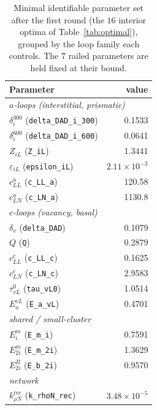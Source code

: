 \documentclass{article}
\begin{document}
\begin{table}[h!]
\centering
\caption{Minimal identifiable parameter set after the first round (the $16$
interior optima of Table~\ref{tab:optimal}), grouped by the loop family each
controls. The $7$ railed parameters are held fixed at their bound.}
\label{tab:minimal}
\renewcommand{\arraystretch}{1.15}
\small
\begin{tabular}{l r}
\hline
\textbf{Parameter} & \textbf{value}\\
\hline
\multicolumn{2}{l}{\textit{$a$-loops (interstitial, prismatic)}}\\
\quad $\delta_i^{300}$ (\texttt{delta\_DAD\_i\_300}) & 0.1533\\
\quad $\delta_i^{600}$ (\texttt{delta\_DAD\_i\_600}) & 0.0641\\
\quad $Z_{iL}$ (\texttt{Z\_iL})                      & 1.3441\\
\quad $\varepsilon_{iL}$ (\texttt{epsilon\_iL})      & $2.11\times10^{-3}$\\
\quad $c_{LL}^{a}$ (\texttt{c\_LL\_a})               & 120.58\\
\quad $c_{LN}^{a}$ (\texttt{c\_LN\_a})               & 1130.8\\
\hline
\multicolumn{2}{l}{\textit{$c$-loops (vacancy, basal)}}\\
\quad $\delta_v$ (\texttt{delta\_DAD})               & 0.1079\\
\quad $Q$ (\texttt{Q})                               & 0.2879\\
\quad $c_{LL}^{c}$ (\texttt{c\_LL\_c})               & 0.1625\\
\quad $c_{LN}^{c}$ (\texttt{c\_LN\_c})               & 2.9583\\
\quad $\tau^0_{vL}$ (\texttt{tau\_vL0})              & 1.0514\\
\quad $E^{vL}_a$ (\texttt{E\_a\_vL})                 & 0.4701\\
\hline
\multicolumn{2}{l}{\textit{shared / small-cluster}}\\
\quad $E^m_i$ (\texttt{E\_m\_i})                     & 0.7591\\
\quad $E^m_{2i}$ (\texttt{E\_m\_2i})                 & 1.3629\\
\quad $E^B_{2i}$ (\texttt{E\_b\_2i})                 & 0.9570\\
\hline
\multicolumn{2}{l}{\textit{network}}\\
\quad $k^{\mathrm{rec}}_{\rho N}$ (\texttt{k\_rhoN\_rec}) & $3.48\times10^{-5}$\\
\hline
\end{tabular}
\end{table}
\end{document}
